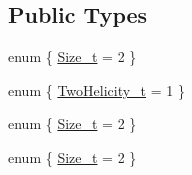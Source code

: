 \subsection*{Public Types}
\begin{DoxyCompactItemize}
\item 
enum \{ \mbox{\hyperlink{structHadron_1_1H1o2D2ERep_a56d3999938a6d5043bd5a57c1411d65cad6e4aaee3d8c296fcebc0d25c86951a5}{Size\+\_\+t}} = 2
 \}
\item 
enum \{ \mbox{\hyperlink{structHadron_1_1H1o2D2ERep_aa573581ac6173f3e4b8e64839861bfb1afea245ddf94890d397365034bffa897c}{Two\+Helicity\+\_\+t}} = 1
 \}
\item 
enum \{ \mbox{\hyperlink{structHadron_1_1H1o2D2ERep_a56d3999938a6d5043bd5a57c1411d65cad6e4aaee3d8c296fcebc0d25c86951a5}{Size\+\_\+t}} = 2
 \}
\item 
enum \{ \mbox{\hyperlink{structHadron_1_1H1o2D2ERep_a56d3999938a6d5043bd5a57c1411d65cad6e4aaee3d8c296fcebc0d25c86951a5}{Size\+\_\+t}} = 2
 \}
\end{DoxyCompactItemize}
